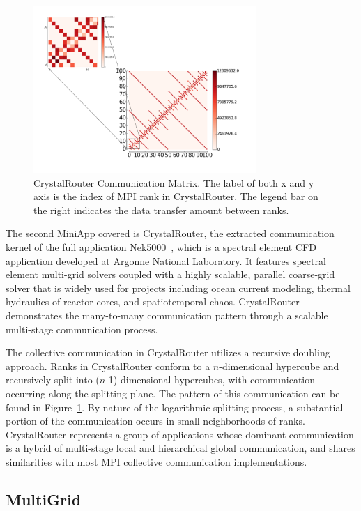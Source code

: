 \begin{figure}[htp]
    \centering
    \includegraphics[height=2.5in]{figs/appstudy/cr/cr_pip}
    \caption{CrystalRouter Communication Matrix. 
        The label of both x and y axis is the index of MPI rank in CrystalRouter. 
        The legend bar on the right indicates the data transfer 
        amount between ranks.
        }
    \label{fig:cr-communication-topology}
\end{figure}

The second MiniApp covered is CrystalRouter, 
the extracted communication kernel of the full application Nek5000~\cite{nek5000}, 
which is a spectral element CFD application developed at Argonne National Laboratory. 
It features spectral element multi-grid solvers coupled with a highly scalable, 
parallel coarse-grid solver that is widely used for projects including ocean current modeling, 
thermal hydraulics of reactor cores, and spatiotemporal chaos. 
CrystalRouter demonstrates the many-to-many communication pattern 
through a scalable multi-stage communication process. 

The collective communication in CrystalRouter utilizes a recursive doubling approach. 
Ranks in CrystalRouter conform to a $n$-dimensional hypercube 
and recursively split into ($n$-1)-dimensional hypercubes, 
with communication occurring along the splitting plane. 
The pattern of this communication can be found in Figure~\ref{fig:cr-communication-topology}. 
By nature of the logarithmic splitting process, 
a substantial portion of the communication occurs in small neighborhoods of ranks. 
CrystalRouter represents a group of applications whose dominant communication 
is a hybrid of multi-stage local and hierarchical global communication, 
and shares similarities with most MPI collective communication implementations.


\subsection{MultiGrid}
\label{sec:multigrid}

